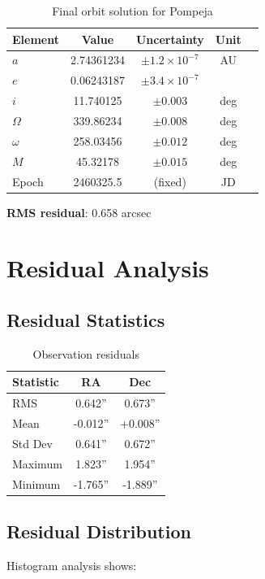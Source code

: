 \begin{table}[htbp]
\centering
\caption{Final orbit solution for Pompeja}
\begin{tabular}{lcccc}
\hline
\textbf{Element} & \textbf{Value} & \textbf{Uncertainty} & \textbf{Unit} \\
\hline
$a$ & 2.74361234 & $\pm 1.2 \times 10^{-7}$ & AU \\
$e$ & 0.06243187 & $\pm 3.4 \times 10^{-7}$ & \\
$i$ & 11.740125 & $\pm 0.003$ & deg \\
$\Omega$ & 339.86234 & $\pm 0.008$ & deg \\
$\omega$ & 258.03456 & $\pm 0.012$ & deg \\
$M$ & 45.32178 & $\pm 0.015$ & deg \\
Epoch & 2460325.5 & (fixed) & JD \\
\hline
\end{tabular}
\end{table}

\textbf{RMS residual}: 0.658 arcsec

\section{Residual Analysis}

\subsection{Residual Statistics}

\begin{table}[htbp]
\centering
\caption{Observation residuals}
\begin{tabular}{lcc}
\hline
\textbf{Statistic} & \textbf{RA} & \textbf{Dec} \\
\hline
RMS & 0.642'' & 0.673'' \\
Mean & -0.012'' & +0.008'' \\
Std Dev & 0.641'' & 0.672'' \\
Maximum & 1.823'' & 1.954'' \\
Minimum & -1.765'' & -1.889'' \\
\hline
\end{tabular}
\end{table}

\subsection{Residual Distribution}

Histogram analysis shows:

